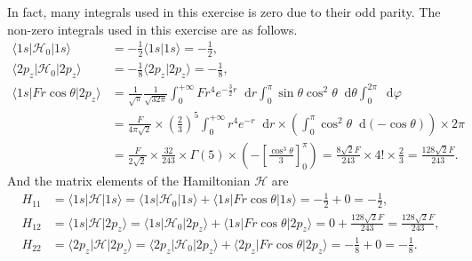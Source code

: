 \documentclass[a4paper]{book}
\newcounter{exercise}[chapter]
\newcounter{solution}[chapter]
\newcommand*{\dif}{\mathop{}\!\mathrm{d}}
\begin{document}
	\begin{solution}
	
	In fact, many integrals used in this exercise is zero due to their odd parity. The non-zero integrals used in this exercise are as follows.
	\begin{align*}
		\langle 1s | \mathscr{H}_0 | 1s \rangle &= -\frac{1}{2} \langle 1s | 1s \rangle = -\frac{1}{2} , \\
		\langle 2p_z | \mathscr{H}_0 | 2p_z \rangle &= -\frac{1}{8} \langle 2p_z | 2p_z \rangle = -\frac{1}{8}, \\
		\langle 1s | Fr\cos \theta | 2p_z \rangle &= \frac{1}{ \sqrt{\pi} } \frac{1}{ \sqrt{ 32\pi } } \int_0^{+\infty} F r^4 e^{ -\frac{3}{2}r } \dif r \int_0^\pi \sin\theta \cos^2 \theta \dif \theta \int_0^{2\pi} \dif \varphi \\
		&= \frac{ F }{ 4\pi \sqrt{2} } \times \left( \frac{2}{3} \right)^5 \int_0^{+\infty} r^4 e^{ -r } \dif r \times \left(  \int_0^\pi \cos^2 \theta \dif ( - \cos \theta ) \right) \times 2\pi \\
		&= \frac{ F }{ 2\sqrt{2} } \times \frac{ 32 }{ 243 } \times \Gamma( 5 ) \times \left( - \left[ \frac{ \cos^3 \theta }{3} \right]^\pi_0 \right) = \frac{ 8\sqrt{2} F }{ 243 } \times 4! \times \frac{2}{3} = \frac{ 128\sqrt{2} F }{ 243 } .
	\end{align*}
	And the matrix elements of the Hamiltonian $\mathscr{H}$ are
	\begin{align*}
		H_{11} &= \langle 1s | \mathscr{H} | 1s \rangle = \langle 1s | \mathscr{H}_0 | 1s \rangle + \langle 1s | Fr\cos \theta | 1s \rangle = -\frac{1}{2} + 0 = -\frac{1}{2} , \\
		H_{12} &= \langle 1s | \mathscr{H} | 2p_z \rangle = \langle 1s | \mathscr{H}_0 | 2p_z \rangle + \langle 1s | Fr\cos \theta | 2p_z \rangle = 0 + \frac{ 128\sqrt{2} F }{ 243 } = \frac{ 128\sqrt{2} F }{ 243 } , \\
		H_{22} &= \langle 2p_z | \mathscr{H} | 2p_z \rangle = \langle 2p_z | \mathscr{H}_0 | 2p_z \rangle + \langle 2p_z | Fr\cos \theta | 2p_z \rangle = -\frac{1}{8} + 0 = -\frac{1}{8}.
 	\end{align*}
 	

\end{solution}
\end{document}
